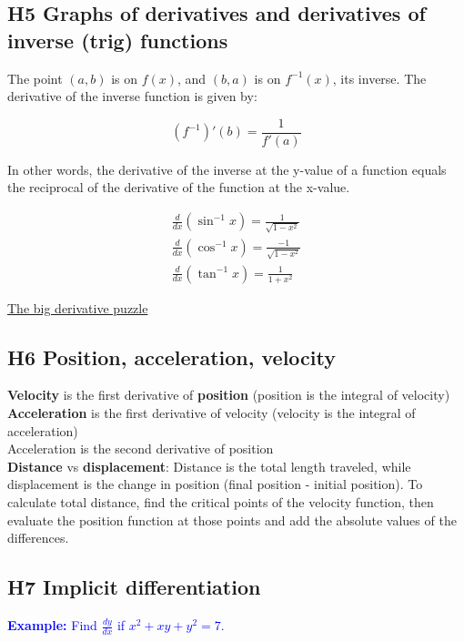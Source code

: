\documentclass[letterpaper, 12pt]{article}
\newcommand{\example}[1]{\textcolor{blue}{\textbf{Example:} #1}}
\begin{document}
\subsection*{H5 Graphs of derivatives and derivatives of inverse (trig) functions}

The point $(a, b)$ is on $f(x)$, and $(b, a)$ is on $f^{-1}(x)$, its inverse. The derivative of the inverse function is given by:

\[(f^{-1})'(b) = \frac{1}{f'(a)}\]

In other words, the derivative of the inverse at the y-value of a function equals the reciprocal of the derivative of the function at the x-value.

\begin{gather*}
\frac{d}{dx} (\sin^{-1} x) = \frac{1}{\sqrt{1-x^2}} \\
\frac{d}{dx} (\cos^{-1} x) = \frac{-1}{\sqrt{1-x^2}} \\
\frac{d}{dx} (\tan^{-1} x) = \frac{1}{1+x^2}
\end{gather*}

\href{https://english.mathe-online.at/tests/diff1/ablerkennen.html}{The big derivative puzzle}

\subsection*{H6 Position, acceleration, velocity}

\textbf{Velocity} is the first derivative of \textbf{position} (position is the integral of velocity) \\
\textbf{Acceleration} is the first derivative of velocity (velocity is the integral of acceleration) \\
Acceleration is the second derivative of position \\

\textbf{Distance} vs \textbf{displacement}: Distance is the total length traveled, while displacement is the change in position (final position - initial position). To calculate total distance, find the critical points of the velocity function, then evaluate the position function at those points and add the absolute values of the differences.

\subsection*{H7 Implicit differentiation}

\example{Find $\frac{dy}{dx}$ if $x^2+xy+y^2 = 7$.}
\end{document}
